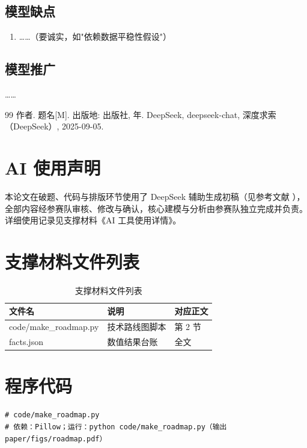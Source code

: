 \documentclass[UTF8,12pt,fontset=windows]{ctexart}
\begin{document}
\subsection{模型缺点}
\begin{enumerate}
  \item ……（要诚实，如"依赖数据平稳性假设"）
\end{enumerate}

\subsection{模型推广}
……

\begin{thebibliography}{99}
 作者. 题名[M]. 出版地: 出版社, 年.
 DeepSeek, deepseek-chat, 深度求索（DeepSeek）, 2025-09-05.
\end{thebibliography}

\section*{AI 使用声明}

本论文在破题、代码与排版环节使用了 DeepSeek 辅助生成初稿（见参考文献 \cite{ai1}），
全部内容经参赛队审核、修改与确认，核心建模与分析由参赛队独立完成并负责。
详细使用记录见支撑材料《AI 工具使用详情》。

\newpage
\appendix

\section{支撑材料文件列表}

\begin{table}[H]
  \centering
  \caption{支撑材料文件列表}
  \begin{tabular}{lll}
    \toprule
    文件名 & 说明 & 对应正文 \\
    \midrule
    code/make\_roadmap.py & 技术路线图脚本 & 第 2 节 \\
    facts.json & 数值结果台账 & 全文 \\
    \bottomrule
  \end{tabular}
\end{table}

\section{程序代码}

\begingroup\small
\begin{verbatim}
# code/make_roadmap.py
# 依赖：Pillow；运行：python code/make_roadmap.py（输出 paper/figs/roadmap.pdf）
\end{verbatim}
\endgroup
\end{document}
